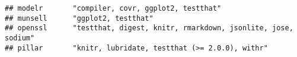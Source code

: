 \documentclass[]{book}
\begin{document}
\begin{verbatim}
## modelr       "compiler, covr, ggplot2, testthat"                                                                                                                                                                                                                                                                                                                                                                                                                                                                                                                                                                                                                                                                       
## munsell      "ggplot2, testthat"                                                                                                                                                                                                                                                                                                                                                                                                                                                                                                                                                                                                                                                                                       
## openssl      "testthat, digest, knitr, rmarkdown, jsonlite, jose, sodium"                                                                                                                                                                                                                                                                                                                                                                                                                                                                                                                                                                                                                                              
## pillar       "knitr, lubridate, testthat (>= 2.0.0), withr"                                                                                                                                                                                                                                                                                                                                                                                                                                                                                                                                                                                                                                                            

\end{verbatim}
\end{document}
